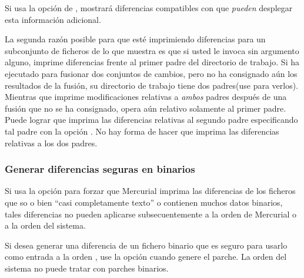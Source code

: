 Si usa la opción  de , mostrará
diferencias compatibles con  que \emph{pueden} desplegar
esta información adicional.

La segunda razón posible para que  esté imprimiendo
diferencias para un subconjunto de ficheros de lo que muestra
 es que si usted le invoca sin argumento alguno,
 imprime diferencias frente al primer padre del directorio
de trabajo.  Si ha ejecutado  para fusionar dos conjuntos
de cambios, pero no ha consignado aún los resultados de la fusión,  su
directorio de trabajo tiene dos padres(use  para
verlos).  Mientras que  imprime modificaciones relativas
a \emph{ambos} padres después de una fusión que no se ha consignado,
 opera aún relativo solamente al primer padre.  Puede
lograr que imprima las diferencias relativas al segundo padre
especificando tal padre con la opción .  No hay forma
de hacer que imprima las diferencias relativas a los dos padres.

\subsubsection{Generar diferencias seguras en binarios}

Si usa la opción  para forzar que Mercurial imprima
las diferencias de los ficheros que so o bien ``casi completamente
texto'' o contienen muchos datos binarios, tales diferencias no pueden
aplicarse subsecuentemente a la orden  de Mercurial o a
la orden  del sistema.

Si desea generar una diferencia de un fichero binario que es seguro
para usarlo como entrada a la orden , use la opción
 cuando genere el parche.  La orden 
del sistema no puede tratar con parches binarios.

